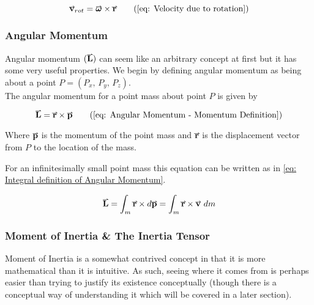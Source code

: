 \documentclass[main.tex]{subfiles}
\begin{document}
                    \begin{equation}
                        \vect{v}_{rot} = \vect{\omega} \times \vect{r}
                        \tag{\eqnum{eq: Velocity due to rotation}}
                    \end{equation}

                \subsubsection{Angular Momentum}
                    
                    Angular momentum $(\vect{L})$ can seem like an arbitrary concept at first but it has some very useful properties. We begin by defining angular momentum as being about a point $P = (P_x,\, P_y,\, P_z)$.\\
                    The angular momentum for a point mass about point $P$ is given by

                    \begin{equation}
                        \vect{L} = \vect{r} \times \vect{p}   \tag{\eqnum{eq: Angular Momentum - Momentum Definition}}
                    \end{equation}

                    Where $\vect{p}$ is the momentum of the point mass and $\vect{r}$ is the displacement vector from $P$ to the location of the mass.

                    For an infinitesimally small point mass this equation can be written as in \eqref{eq: Integral definition of Angular Momentum}.

                    \begin{equation}
                        \vect{L} = \int_m \vect{r} \times d\vect{p} = \int_m \vect{r} \times \vect{v} \ud m
                        \label{eq: Integral definition of Angular Momentum}
                    \end{equation}

                \subsubsection{Moment of Inertia \& The Inertia Tensor}

                    Moment of Inertia is a somewhat contrived concept in that it is more mathematical than it is intuitive. As such, seeing where it comes from is perhaps easier than trying to justify its existence conceptually (though there is a conceptual way of understanding it which will be covered in a later section).
\end{document}
